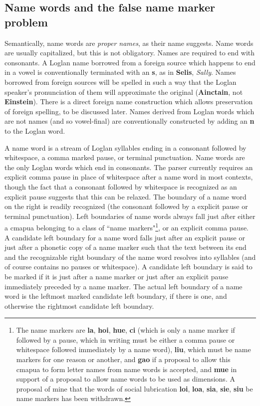 \documentclass[12pt]{book}
\begin{document}
\subsection{Name words and the false name marker problem}

Semantically, name words are {\em proper names\/}, as their name suggests.  Name words are usually capitalized, but this is not obligatory.  Names are required to end with consonants.  A Loglan name borrowed from a foreign source which happens to end in a vowel is conventionally terminated with an {\bf s},
as in {\bf Selis}, {\em Sally\/}.  Names borrowed from foreign sources will be spelled in such a way that the Loglan speaker's pronunciation of them will approximate the original ({\bf Ainctain}, not {\bf Einstein}).  There is a direct foreign name construction which allows preservation of foreign spelling, to be discussed later.  Names derived from Loglan words which are not names (and so vowel-final) are conventionally constructed by adding an {\bf n} to
the Loglan word.

A name word is a stream of Loglan syllables ending in a consonant followed by whitespace, a comma marked pause, or terminal punctuation.  Name words are the only Loglan words which end in consonants.  The parser currently requires an explicit comma pause in place of whitespace after a name word in most contexts, though the fact that a consonant followed by whitespace is recognized as an explicit pause suggests that this can be relaxed.  The boundary of a name word on the right is readily recognized (the consonant followed by a explicit pause or terminal punctuation).  Left boundaries of name words always fall just after either a cmapua belonging to a class of ``name markers"\footnote{The name markers are {\bf la}, {\bf hoi}, {\bf hue}, {\bf ci} (which is only a name marker if followed by a pause, which in writing must be either a comma pause or whitespace followed immediately by a name word), {\bf liu}, which must be name markers for one reason or another, and {\bf gao} if a proposal to allow this cmapua to form letter names from name words is accepted, and {\bf mue} in support of a proposal to allow name words to be used as dimensions.  A proposal of mine that the words of social lubrication {\bf loi}, {\bf loa}, {\bf sia}, {\bf sie}, {\bf siu} be name markers has been withdrawn.}, or an explicit comma pause.   A candidate left boundary for a name word falls just after an explicit pause or just after a phonetic copy of a name marker such that the text between its end and the recognizable right boundary of the name word resolves into syllables (and of course contains no pauses or whitespace).   A candidate left boundary is said to be marked if it is just after a name marker  or just after an explicit pause immediately preceded by a name marker.  The actual left boundary of a name word is the leftmost marked candidate left boundary, if there is one, and otherwise the rightmost candidate left boundary.
\end{document}
